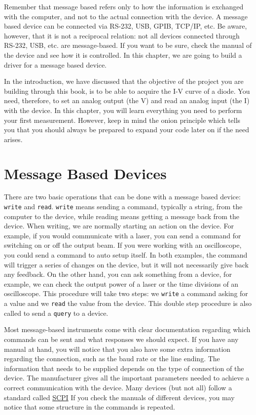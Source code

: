Remember that message based refers only to how the information is
exchanged with the computer, and not to the actual connection with the
device. A message based device can be connected via RS-232, USB,
GPIB, TCP/IP, etc. Be aware, however, that it is not a reciprocal
relation: not all devices connected through RS-232, USB, etc. are
message-based. If you want to be sure, check the manual of the device
and see how it is controlled. In this chapter, we are going to build a
driver for a message based device.

In the introduction, we have discussed that the objective of the project
you are building through this book, is to be able to acquire the I-V
curve of a diode. You need, therefore, to set an analog output (the V)
and read an analog input (the I) with the device. In this chapter, you
will learn everything you need to perform your first measurement.
However, keep in mind the onion principle which tells you that you
should always be prepared to expand your code later on if the
need arises.

\section{Message Based Devices}\label{message-basedevices}
There are two basic operations that can be done with a message based
device: \texttt{write} and \texttt{read}. \texttt{write}  means sending a command,
typically a string, from the computer to the device, while reading means
getting a message back from the device. When writing, we are normally
starting an action on the device. For example, if you would communicate with a 
laser, you can send a command for switching on or off the
output beam. If you were working with an oscilloscope, you could send a
command to auto setup itself. In both examples, the command will trigger
a series of changes on the device, but it will not necessarily give back
any feedback. On the other hand, you can ask something from a device,
for example, we can check the output power of a laser or the time
divisions of an oscilloscope. This procedure will take two steps: we
\texttt{write} a command asking for a value and we 
\texttt{read} the
value from the device. This double step procedure is also called to send a 
\texttt{query} to a device.

Most message-based instruments come with clear documentation regarding
which commands can be sent and what responses we should expect. If you
have any manual at hand, you will notice that you also have some extra
information regarding the connection, such as the baud rate or the line
ending. The information that needs to be supplied depends on the type of
connection of the device. The manufacturer gives all the important parameters needed to achieve a correct communication with the
device. Many devices (but not all) follow a standard called 
\href{
https://en.wikipedia.org/wiki/Standard_Commands_for_Programmable_Instruments}{
SCPI} 
If you check the manuals of different devices, you may notice that some
structure in the commands is repeated.

